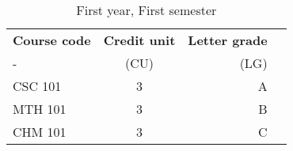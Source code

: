 \documentclass{article}
\begin{document}
  
	\begin{table}[h!]
		\begin{center}
			\caption{First year, First semester}
			\label{tab:table1}
			\begin{tabular}{l|c|r|c}
		\textbf{Course code}& \textbf{Credit unit} &
			\textbf{Letter grade} \\
				- & (CU) & (LG) \\
				\hline
				CSC 101 & 3 & A\\
				MTH 101 & 3 & B\\
				CHM 101 & 3 & C\\
			\end{tabular}
		\end{center}
	\end{table}
				
			
\end{document}
